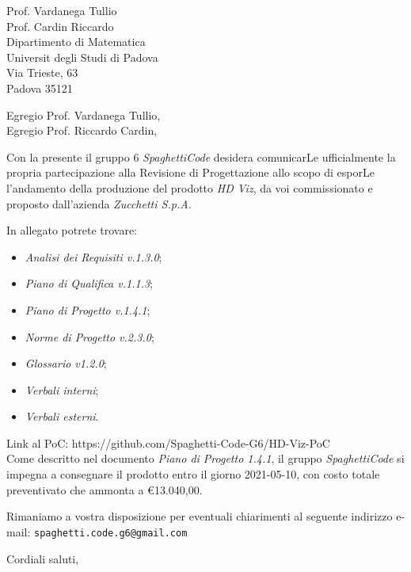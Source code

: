 \documentclass[a4paper,12pt]{letteracdp}
\date{10 marzo 2021}
\begin{document}
\begin{letter}{
\vspace*{-2\baselineskip}
Prof. Vardanega Tullio \\
Prof. Cardin Riccardo \\
Dipartimento di Matematica \\
Universit degli Studi di Padova \\
Via Trieste, 63 \\
Padova 35121}

\opening{Egregio Prof. Vardanega Tullio, \\
\noindent Egregio Prof. Riccardo Cardin,}

\begin{flushleft}
Con la presente il gruppo 6 \textit{SpaghettiCode} desidera comunicarLe ufficialmente la propria partecipazione alla Revisione di 
Progettazione allo scopo di esporLe l'andamento della produzione del prodotto \textit{HD Viz}, da voi commissionato e proposto 
dall'azienda \textit{Zucchetti S.p.A.}

In allegato potrete trovare:
\end{flushleft}

\begin{itemize}
\item \emph{Analisi dei Requisiti v.1.3.0};
\item \emph{Piano di Qualifica v.1.1.3};
\item \emph{Piano di Progetto v.1.4.1};
\item \emph{Norme di Progetto v.2.3.0};
\item \emph{Glossario v1.2.0};
\item \emph{Verbali interni};
\item \emph{Verbali esterni}.
\end{itemize}

\begin{flushleft}
Link al PoC: https://github.com/Spaghetti-Code-G6/HD-Viz-PoC \\
Come descritto nel documento \emph{Piano di Progetto 1.4.1}, il gruppo \textit{SpaghettiCode} si impegna a consegnare il prodotto entro il 
giorno 2021-05-10, con costo totale preventivato che ammonta a \euro{13.040,00}.

Rimaniamo a vostra disposizione per eventuali chiarimenti al seguente indirizzo e-mail: {\texttt{spaghetti.code.g6@gmail.com}}
\end{flushleft}

\closing{Cordiali saluti,}

\end{letter}
\end{document}

